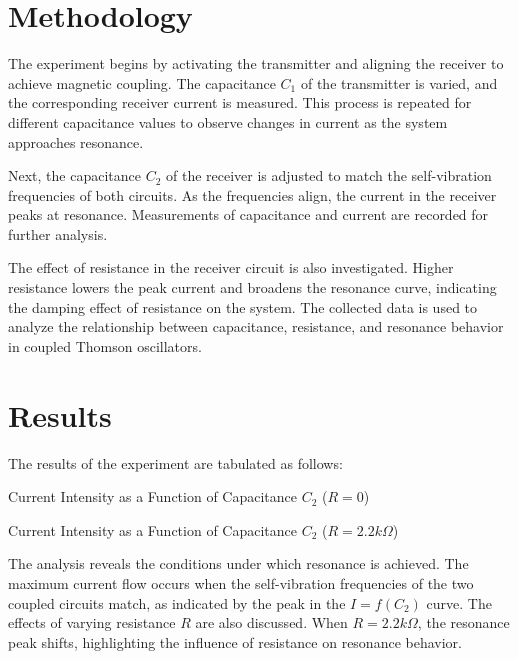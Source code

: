\documentclass[journal]{IEEEtran}
\begin{document}
\section{Methodology}
The experiment begins by activating the transmitter and aligning the receiver to achieve magnetic coupling. The capacitance \(C_1\) of the transmitter is varied, and the corresponding receiver current is measured. This process is repeated for different capacitance values to observe changes in current as the system approaches resonance.

Next, the capacitance \(C_2\) of the receiver is adjusted to match the self-vibration frequencies of both circuits. As the frequencies align, the current in the receiver peaks at resonance. Measurements of capacitance and current are recorded for further analysis.

The effect of resistance in the receiver circuit is also investigated. Higher resistance lowers the peak current and broadens the resonance curve, indicating the damping effect of resistance on the system. The collected data is used to analyze the relationship between capacitance, resistance, and resonance behavior in coupled Thomson oscillators.


\section{Results}
The results of the experiment are tabulated as follows:

\begin{table}[H]
    \centering
    

    \caption{Current Intensity as a Function of Capacitance \( C_2 \) (\( R = 0 \))}
    \label{tab:c2_r0}
\end{table}

\begin{table}[H]
    \centering
    \caption{Current Intensity as a Function of Capacitance \( C_2 \) (\( R = 2.2k\Omega \))}
    \label{tab:c2_r22}
\end{table}

The analysis reveals the conditions under which resonance is achieved. The maximum current flow occurs when the self-vibration frequencies of the two coupled circuits match, as indicated by the peak in the \( I = f(C_2) \) curve. The effects of varying resistance \( R \) are also discussed. When \( R = 2.2k\Omega \), the resonance peak shifts, highlighting the influence of resistance on resonance behavior.
\end{document}
